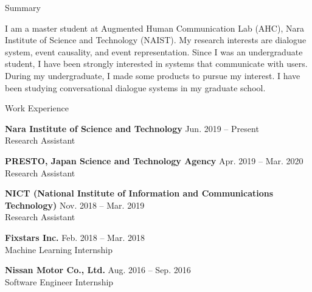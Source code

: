 \documentclass{resume} %
\begin{document}

\begin{rSection}{Summary}

I am a master student at Augmented Human Communication Lab (AHC), Nara Institute of Science and Technology (NAIST).
My research interests are dialogue system, event causality, and event representation.
Since I was an undergraduate student, I have been strongly interested in systems that communicate with users.
During my undergraduate, I made some products to pursue my interest.
I have been studying conversational dialogue systems in my graduate school.

\end{rSection}


\begin{rSection}{Work Experience}

{\bf Nara Institute of Science and Technology} \hfill {Jun. 2019 -- Present}
\\Research Assistant

{\bf PRESTO, Japan Science and Technology Agency} \hfill {Apr. 2019 -- Mar. 2020}
\\Research Assistant

{\bf NICT (National Institute of Information and Communications Technology)} \hfill {Nov. 2018 -- Mar. 2019}
\\Research Assistant

{\bf Fixstars Inc.} \hfill {Feb. 2018 -- Mar. 2018}
\\Machine Learning Internship

{\bf Nissan Motor Co., Ltd.} \hfill {Aug. 2016 -- Sep. 2016}
\\Software Engineer Internship

\end{rSection}

\end{document}
